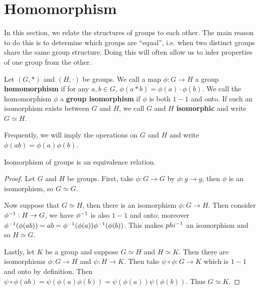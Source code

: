 \section{Homomorphism}
\label{section_1.5}

In this section, we relate the structures of groups to each other. The main
reason to do this is to determine which groups are ``equal'', i.e. when two
distinct groups share the same group structure. Doing this will often allow us
to infer properties of one group from the other.

\begin{definition}
  Let $(G, \ast)$ and $(H, \cdot)$ be groups. We call a map $\phi:G
  \rightarrow H$ a group \textbf{homomorphism} if for any $a,b \in G$,
  $\phi(a \ast b)=\phi(a) \cdot \phi(b)$. We call the homomorphism $\phi$ a
  \textbf{group isomorphism} if $\phi$ is both  $1-1$ and onto. If such an
  isomorphism exists between  $G$ and  $H$, we call  $G$ and  $H$
  \textbf{isomorphic} and write $G \simeq H$.
\end{definition}
\begin{remark}
  Frequently, we will imply the operations on $G$ and  $H$ and write
  $\phi(ab)=\phi(a)\phi(b)$.
\end{remark}

\begin{proposition}\label{proposition_1.5.1}
  Isomorphism of groups is an equivalence relation.
\end{proposition}
\begin{proof}
  Let $G$ and  $H$ be groups. First, take $\phi:G \rightarrow G$ by $\phi:g
  \rightarrow g$, then $\phi$ is an isomorphism, so $G \simeq G$.

  Now suppose that  $G \simeq H$, then there is an isomorphism  $\phi:G
  \rightarrow H$. Then consider $\phi^{-1}:H \rightarrow G$, we have
  $\phi^{-1}$ is also $1-1$ and onto; moreover
  $\phi^{-1}(\phi(ab))=ab=\phi^{-1}(\phi(a))\phi^{-1}(\phi(b))$. This makes
  $phi^{-1}$ an isomorphism and so $H \simeq G$.

  Lastly, let  $K$ be a group and suppose  $G \simeq H$ and  $H \simeq K$.
  Then there are isomorphisms  $\phi:G \rightarrow H$ and $\psi:H \rightarrow
  K$. Then take $\psi \circ \phi:G \rightarrow K$ which is $1-1$ and onto by
  definition. Then $\psi \circ
  \phi(ab)=\psi(\phi(a)\phi(b))=\psi(\phi(a))\psi(\phi(b))$. Thus $G \simeq
  K$.
\end{proof}

